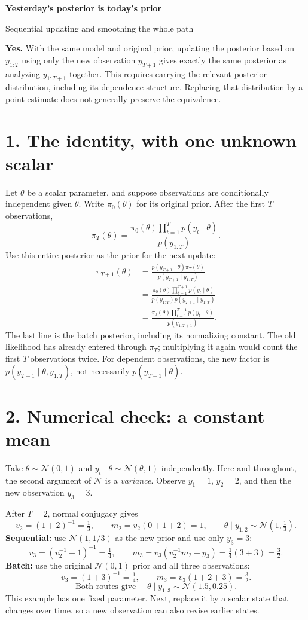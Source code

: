 \documentclass[10pt,a4paper]{article}
\newcommand{\Normal}{\mathcal N}
\begin{document}
{\color{ink}\LARGE\bfseries Yesterday's posterior is today's prior\par}
{\large Sequential updating and smoothing the whole path\par}
\medskip
\textbf{Yes.} With the same model and original prior, updating the posterior based on
$y_{1:T}$ using only the new observation $y_{T+1}$ gives exactly the same posterior as
analyzing $y_{1:T+1}$ together. This requires carrying the relevant posterior distribution,
including its dependence structure. Replacing that distribution by a point estimate
does not generally preserve the equivalence.

\section*{1. The identity, with one unknown scalar}
Let $\theta$ be a scalar parameter, and suppose observations are conditionally independent
given $\theta$. Write $\pi_0(\theta)$ for its original prior. After the first $T$ observations,
\[
\pi_T(\theta)=
\frac{\pi_0(\theta)\prod_{t=1}^T p(y_t\mid\theta)}{p(y_{1:T})}.
\]
Use this entire posterior as the prior for the next update:
\begin{align*}
\pi_{T+1}(\theta)
&=\frac{p(y_{T+1}\mid\theta)\pi_T(\theta)}{p(y_{T+1}\mid y_{1:T})}\\
&=\frac{\pi_0(\theta)\prod_{t=1}^{T+1}p(y_t\mid\theta)}
{p(y_{1:T})p(y_{T+1}\mid y_{1:T})}\\
&=\frac{\pi_0(\theta)\prod_{t=1}^{T+1}p(y_t\mid\theta)}{p(y_{1:T+1})}.
\end{align*}
The last line is the batch posterior, including its normalizing constant.
The old likelihood has already entered through $\pi_T$; multiplying it again would
count the first $T$ observations twice. For dependent observations, the new factor is
$p(y_{T+1}\mid\theta,y_{1:T})$, not necessarily $p(y_{T+1}\mid\theta)$.

\section*{2. Numerical check: a constant mean}
Take $\theta\sim\Normal(0,1)$ and $y_t\mid\theta\sim\Normal(\theta,1)$ independently.
Here and throughout, the second argument of $\Normal$ is a \emph{variance}.
Observe $y_1=1$, $y_2=2$, and then the new observation $y_3=3$.

After $T=2$, normal conjugacy gives
\[
v_2=(1+2)^{-1}=\tfrac13,\qquad
m_2=v_2(0+1+2)=1,\qquad \theta\mid y_{1:2}\sim\Normal(1,\tfrac13).
\]
\textbf{Sequential:} use $\Normal(1,1/3)$ as the new prior and use only $y_3=3$:
\[
v_3=(v_2^{-1}+1)^{-1}=\tfrac14,\qquad
m_3=v_3(v_2^{-1}m_2+y_3)=\tfrac14(3+3)=\tfrac32.
\]
\textbf{Batch:} use the original $\Normal(0,1)$ prior and all three observations:
\[
v_3=(1+3)^{-1}=\tfrac14,\qquad m_3=v_3(1+2+3)=\tfrac32.
\]
\[
\boxed{\text{Both routes give }\quad\theta\mid y_{1:3}\sim\Normal(1.5,0.25).}
\]
This example has one fixed parameter. Next, replace it by a scalar state that changes
over time, so a new observation can also revise earlier states.
\end{document}
